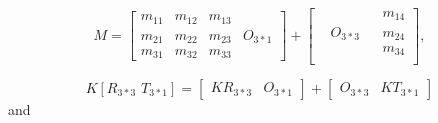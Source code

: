 \begin{equation}
M =
\begin{bmatrix} 
m_{11} & m_{12} & m_{13} &  \\
m_{21} & m_{22} & m_{23} & O_{3*1} \\
m_{31} & m_{32} & m_{33} &  
\end{bmatrix}%
+
\begin{bmatrix} 
 &  &  & m_{14} \\
 & O_{3*3} &  & m_{24} \\
 &  &  & m_{34} \\
\end{bmatrix} , %
\label{decomposePerspectiveProjectionOne}
\end{equation}%

\begin{equation}
K[R_{3*3} \, \, T_{3*1}] =
\begin{bmatrix} 
KR_{3*3} & O_{3*1}
 \end{bmatrix}%
+
\begin{bmatrix} 
O_{3*3} & KT_{3*1}
\end{bmatrix}%
\label{decomposePerspectiveProjectionTwo}
\end{equation}%
%
and 

